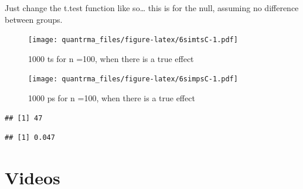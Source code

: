 \documentclass[
]{book}
\newenvironment{Shaded}{\begin{snugshade}}{\end{snugshade}}
\newcommand{\ControlFlowTok}[1]{\textcolor[rgb]{0.13,0.29,0.53}{\textbf{#1}}}
\newcommand{\DataTypeTok}[1]{\textcolor[rgb]{0.13,0.29,0.53}{#1}}
\newcommand{\DecValTok}[1]{\textcolor[rgb]{0.00,0.00,0.81}{#1}}
\newcommand{\KeywordTok}[1]{\textcolor[rgb]{0.13,0.29,0.53}{\textbf{#1}}}
\newcommand{\NormalTok}[1]{#1}
\newcommand{\OperatorTok}[1]{\textcolor[rgb]{0.81,0.36,0.00}{\textbf{#1}}}
\newcommand{\OtherTok}[1]{\textcolor[rgb]{0.56,0.35,0.01}{#1}}
\newcommand{\StringTok}[1]{\textcolor[rgb]{0.31,0.60,0.02}{#1}}
\begin{document}
Just change the t.test function like so\ldots{} this is for the null, assuming no difference between groups.

\begin{Shaded}
\end{Shaded}

\begin{figure}
\centering
\texttt{[image: quantrma\_files/figure-latex/6simtsC-1.pdf]}
\caption{\label{fig:6simtsC}1000 ts for n =100, when there is a true effect}
\end{figure}

\begin{figure}
\centering
\texttt{[image: quantrma\_files/figure-latex/6simpsC-1.pdf]}
\caption{\label{fig:6simpsC}1000 ps for n =100, when there is a true effect}
\end{figure}

\begin{verbatim}
## [1] 47
\end{verbatim}

\begin{verbatim}
## [1] 0.047
\end{verbatim}

\hypertarget{videos}{%
\section{Videos}\label{videos}}
\end{document}
